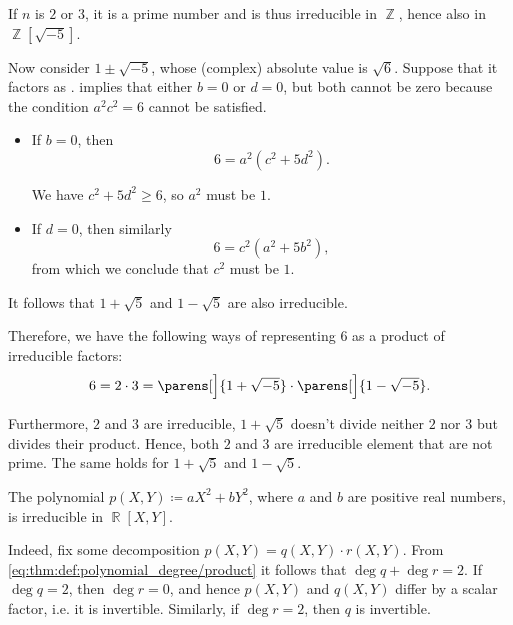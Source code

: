 \begin{example}
\begin{thmenum}
    If \( n \) is \( 2 \) or \( 3 \), it is a prime number and is thus irreducible in \( \BbbZ \), hence also in \( \BbbZ[\sqrt{-5}] \).

    Now consider \( 1 \pm \sqrt{-5} \), whose (complex) absolute value is \( \sqrt 6 \). Suppose that it factors as .  implies that either \( b = 0 \) or \( d = 0 \), but both cannot be zero because the condition \( a^2 c^2 = 6 \) cannot be satisfied.
    \begin{itemize}
      \item If \( b = 0 \), then
      \begin{equation*}
        6 = a^2 (c^2 + 5 d^2).
      \end{equation*}

      We have \( c^2 + 5 d^2 \geq 6 \), so \( a^2 \) must be \( 1 \).

      \item If \( d = 0 \), then similarly
      \begin{equation*}
        6 = c^2 (a^2 + 5b^2),
      \end{equation*}
      from which we conclude that \( c^2 \) must be \( 1 \).
    \end{itemize}

    It follows that \( 1 + \sqrt{5} \) and \( 1 - \sqrt{5} \) are also irreducible.

    Therefore, we have the following ways of representing \( 6 \) as a product of irreducible factors:
    \begin{equation*}
      6 = 2 \cdot 3 = \parens[\Big]{ 1 + \sqrt{-5} } \cdot \parens[\Big]{ 1 - \sqrt{-5}}.
    \end{equation*}

    Furthermore, \( 2 \) and \( 3 \) are irreducible, \( 1 + \sqrt{5} \) doesn't divide neither \( 2 \) nor \( 3 \) but divides their product. Hence, both \( 2 \) and \( 3 \) are irreducible element that are not prime. The same holds for \( 1 + \sqrt{5} \) and \( 1 - \sqrt{5} \).

     The polynomial \( p(X, Y) \coloneqq a X^2 + b Y^2 \), where \( a \) and \( b \) are positive real numbers, is irreducible in \( \BbbR[X, Y] \).

    Indeed, fix some decomposition \( p(X, Y) = q(X, Y) \cdot r(X, Y) \). From \eqref{eq:thm:def:polynomial_degree/product} it follows that \( \deg q + \deg r = 2 \). If \( \deg q = 2 \), then \( \deg r = 0 \), and hence \( p(X, Y) \) and \( q(X, Y) \) differ by a scalar factor, i.e. it is invertible. Similarly, if \( \deg r = 2 \), then \( q \) is invertible.


\end{thmenum}
\end{example}

